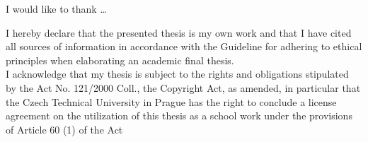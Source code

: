 \documentclass[english,bachelor,unicode]{ctufit-thesis}
\theoremstyle{plain}
\theoremstyle{definition}
\theoremstyle{remark}
\numberwithin{theorem}{chapter}
\begin{document}
    \frontmatter\frontmatterinit %


    \thispagestyle{empty}\cleardoublepage\maketitle %

    \imprintpage %

    \tableofcontents %
    \listoffigures %
    \begingroup
    \let\clearpage\relax
    \listoftables %
    \lstlistoflistings %
    \endgroup

    \begin{acknowledgmentpage}
        I would like to thank \ldots %
    \end{acknowledgmentpage}


    \begin{declarationpage}
        I hereby declare that the presented thesis is my own work and that I have cited all
        sources of information in accordance with the Guideline for adhering to ethical
        principles when elaborating an academic final thesis.\\
        I acknowledge that my thesis is subject to the rights and obligations stipulated by the
        Act No. 121/2000 Coll., the Copyright Act, as amended, in particular that the Czech
        Technical University in Prague has the right to conclude a license agreement on the
        utilization of this thesis as a school work under the provisions of Article 60 (1) of the
        Act
    \end{declarationpage}
\end{document}
